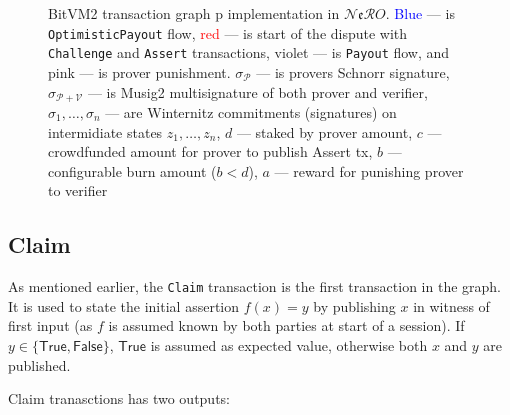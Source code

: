 \documentclass{iacrtrans}
\newcommand{\nero}{$\mathcal{N}\mathfrak{e}\mathcal{R}O$}
\begin{document}
\begin{figure}[hb]
  \caption[BitVM2 Transaction Graph]{BitVM2 transaction graph
   p implementation in \nero. \textcolor{blue}{Blue} --- is
    \texttt{OptimisticPayout} flow, \textcolor{red}{red} --- is start of
    the dispute with \texttt{Challenge} and \texttt{Assert}
    transactions, \textcolor{blue!30}{violet} --- is \texttt{Payout}
    flow, and \textcolor{red!30}{pink} --- is prover punishment.
    $\sigma_{\mathcal{P}}$ --- is provers Schnorr signature,
    $\sigma_{\mathcal{P} + \mathcal{V}}$ --- is Musig2 multisignature of both prover and
    verifier, $\sigma_1, \ldots, \sigma_n$ --- are Winternitz commitments (signatures)
    on intermidiate states $z_1, \ldots, z_n$, $d$ --- staked by prover
    amount, $c$ --- crowdfunded amount for prover to publish Assert tx,
    $b$ --- configurable burn amount ($b < d$), $a$ --- reward for
    punishing prover to verifier}\label{fig:txs-graph}
\end{figure}

\subsection{Claim}\label{sec:claim-tx}

As mentioned earlier, the \texttt{Claim} transaction is the first
transaction in the graph. It is used to state the initial assertion
$f(x) = y$ by publishing $x$ in witness of first input (as $f$ is
assumed known by both parties at start of a session). If
$y \in \{\mathsf{True}, \mathsf{False}\}$, $\mathsf{True}$ is assumed as
expected value, otherwise both $x$ and $y$ are published.

Claim tranasctions has two outputs:
\end{document}

